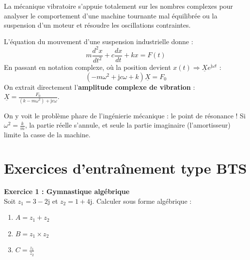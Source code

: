 \documentclass[11pt,a4paper]{article}
\newcommand{\jc}{\mathrm{j}} %
\newcommand{\cpx}[1]{\underline{#1}} %
\begin{document}
La mécanique vibratoire s'appuie totalement sur les nombres complexes pour analyser le comportement d'une machine tournante mal équilibrée ou la suspension d'un moteur et résoudre les oscillations contraintes.

\begin{center}
\end{center}

L'équation du mouvement d'une suspension industrielle donne :
\[ m \frac{d^2x}{dt^2} + c \frac{dx}{dt} + k x = F(t) \]
En passant en notation complexe, où la position devient $x(t) \Rightarrow \cpx{X}e^{\jc\omega t}$ :
\[ (-m\omega^2 + \jc c\omega + k)\cpx{X} = F_0 \]
On extrait directement l'\textbf{amplitude complexe de vibration} : $\cpx{X} = \frac{F_0}{(k - m\omega^2) + \jc c\omega}$.

On y voit le problème phare de l'ingénierie mécanique : le point de résonance ! Si $\omega^2 = \frac{k}{m}$, la partie réelle s'annule, et seule la partie imaginaire (l'amortisseur) limite la casse de la machine.

\newpage
\section{Exercices d'entraînement type BTS}

\textbf{Exercice 1 : Gymnastique algébrique} \\
Soit $z_1 = 3 - 2\jc$ et $z_2 = 1 + 4\jc$. Calculer sous forme algébrique :
\begin{enumerate}
    \item $A = z_1 + z_2$
    \item $B = z_1 \times z_2$
    \item $C = \frac{z_1}{z_2}$
\end{enumerate}
\end{document}
